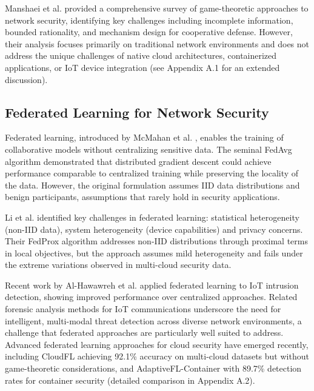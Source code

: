 \documentclass[12pt,a4paper]{article}
\theoremstyle{definition}
\begin{document}
Manshaei et al. \cite{manshaei2013game} provided a comprehensive survey of game-theoretic approaches to network security, identifying key challenges including incomplete information, bounded rationality, and mechanism design for cooperative defense. However, their analysis focuses primarily on traditional network environments and does not address the unique challenges of native cloud architectures, containerized applications, or IoT device integration (see Appendix A.1 for an extended discussion).

\subsection{Federated Learning for Network Security}

Federated learning, introduced by McMahan et al. \cite{mcmahan2017communication}, enables the training of collaborative models without centralizing sensitive data. The seminal FedAvg algorithm demonstrated that distributed gradient descent could achieve performance comparable to centralized training while preserving the locality of the data. However, the original formulation assumes IID data distributions and benign participants, assumptions that rarely hold in security applications.

Li et al. \cite{li2020federated} identified key challenges in federated learning: statistical heterogeneity (non-IID data), system heterogeneity (device capabilities) and privacy concerns. Their FedProx algorithm addresses non-IID distributions through proximal terms in local objectives, but the approach assumes mild heterogeneity and fails under the extreme variations observed in multi-cloud security data.

Recent work by Al-Hawawreh et al. \cite{alhawawreh2018federated} applied federated learning to IoT intrusion detection, showing improved performance over centralized approaches. Related forensic analysis methods for IoT communications \cite{ding2024survey} underscore the need for intelligent, multi-modal threat detection across diverse network environments, a challenge that federated approaches are particularly well suited to address. Advanced federated learning approaches for cloud security have emerged recently, including CloudFL \cite{wang2024cloudfl} achieving 92.1\% accuracy on multi-cloud datasets but without game-theoretic considerations, and AdaptiveFL-Container \cite{chen2024adaptive} with 89.7\% detection rates for container security (detailed comparison in Appendix A.2).
\end{document}
